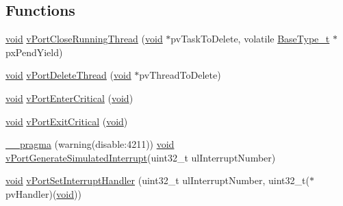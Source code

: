 \subsection*{Functions}
\begin{DoxyCompactItemize}
\item 
\hyperlink{Paradigm_2Tern__EE_2small_2portmacro_8h_a14d32f8130d3c0b212cfc751730b5b49}{void} \hyperlink{MSVC-MingW_2portmacro_8h_ad3564ae551c470eeb87262ed6c2f3cee}{v\-Port\-Close\-Running\-Thread} (\hyperlink{Paradigm_2Tern__EE_2small_2portmacro_8h_a14d32f8130d3c0b212cfc751730b5b49}{void} $\ast$pv\-Task\-To\-Delete, volatile \hyperlink{Flsh186_2prtmacro_8h_ac826f39420fcf5b32ba7123a1d243f99}{Base\-Type\-\_\-t} $\ast$px\-Pend\-Yield)
\item 
\hyperlink{Paradigm_2Tern__EE_2small_2portmacro_8h_a14d32f8130d3c0b212cfc751730b5b49}{void} \hyperlink{MSVC-MingW_2portmacro_8h_a0ff38519b01649ce7a5c6a2d91204940}{v\-Port\-Delete\-Thread} (\hyperlink{Paradigm_2Tern__EE_2small_2portmacro_8h_a14d32f8130d3c0b212cfc751730b5b49}{void} $\ast$pv\-Thread\-To\-Delete)
\item 
\hyperlink{Paradigm_2Tern__EE_2small_2portmacro_8h_a14d32f8130d3c0b212cfc751730b5b49}{void} \hyperlink{MSVC-MingW_2portmacro_8h_a2ed3554a3de09a3bd09d396ee081ab69}{v\-Port\-Enter\-Critical} (\hyperlink{Paradigm_2Tern__EE_2small_2portmacro_8h_a14d32f8130d3c0b212cfc751730b5b49}{void})
\item 
\hyperlink{Paradigm_2Tern__EE_2small_2portmacro_8h_a14d32f8130d3c0b212cfc751730b5b49}{void} \hyperlink{MSVC-MingW_2portmacro_8h_aed20ada05b957181a0de042802a82a5b}{v\-Port\-Exit\-Critical} (\hyperlink{Paradigm_2Tern__EE_2small_2portmacro_8h_a14d32f8130d3c0b212cfc751730b5b49}{void})
\item 
\hyperlink{MSVC-MingW_2portmacro_8h_aa96879487bfeaee8781301a07a5bed16}{\-\_\-\-\_\-pragma} (warning(disable\-:4211)) \hyperlink{Paradigm_2Tern__EE_2small_2portmacro_8h_a14d32f8130d3c0b212cfc751730b5b49}{void} \hyperlink{MSVC-MingW_2port_8c_a42248a1986691ed4d9344fd75789d69c}{v\-Port\-Generate\-Simulated\-Interrupt}(uint32\-\_\-t ul\-Interrupt\-Number)
\item 
\hyperlink{Paradigm_2Tern__EE_2small_2portmacro_8h_a14d32f8130d3c0b212cfc751730b5b49}{void} \hyperlink{MSVC-MingW_2portmacro_8h_a35b5d3a9b147da8e3adda2a2cc7b6cc0}{v\-Port\-Set\-Interrupt\-Handler} (uint32\-\_\-t ul\-Interrupt\-Number, uint32\-\_\-t($\ast$pv\-Handler)(\hyperlink{Paradigm_2Tern__EE_2small_2portmacro_8h_a14d32f8130d3c0b212cfc751730b5b49}{void}))
\end{DoxyCompactItemize}


